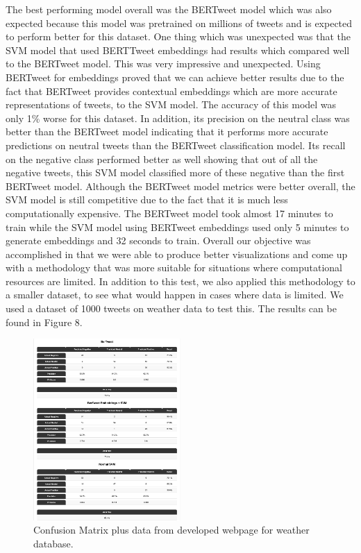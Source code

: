\documentclass[conference]{IEEEtran}
\begin{document}
The best performing model overall was the BERTweet model which was also expected because this model was pretrained on millions of tweets and is expected to perform better for this dataset. One thing which was unexpected was that the SVM model that used BERTTweet embeddings had results which compared well to the BERTweet model. This was very impressive and unexpected. Using BERTweet for embeddings proved that we can achieve better results due to the fact that BERTweet provides contextual embeddings which are more accurate representations of tweets, to the SVM model. The accuracy of this model was only 1\% worse for this dataset. In addition, its precision on the neutral class was better than the BERTweet model indicating that it performs more accurate predictions on neutral tweets than the BERTweet classification model. Its recall on the negative class performed better as well showing that out of all the negative tweets, this SVM model classified more of these negative than the first BERTweet model.
Although the BERTweet model metrics were better overall, the SVM model is still competitive due to the fact that it is much less computationally expensive.  The BERTweet model took almost 17 minutes to train while the SVM model using BERTweet embeddings used only 5 minutes to generate embeddings and 32 seconds to train. Overall our objective was accomplished in that we were able to produce better visualizations and come up with a methodology that was more suitable for situations where computational resources are limited. In addition to this test, we also applied this methodology to a smaller dataset, to see what would happen in cases where data is limited. We used a dataset of 1000 tweets on weather data to test this. The results can be found in Figure 8.

\begin{figure}[b!]
    \includegraphics[width=0.5\textwidth]{weather_results.png}
    \caption{Confusion Matrix plus data from developed webpage for weather database.}
\end{figure}
\end{document}
